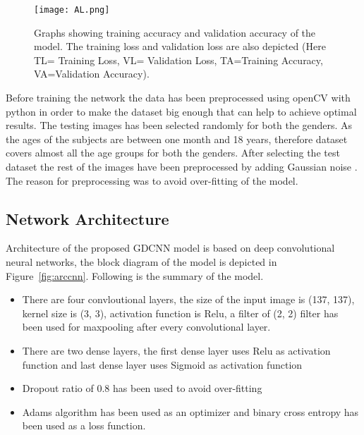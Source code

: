 \documentclass{bioinfo}
\begin{document}
\begin{figure*}[h]%
\texttt{[image: AL.png]}
\caption{Graphs showing training accuracy and validation accuracy of the model. The training loss and validation loss are also depicted (Here TL= Training Loss, VL= Validation Loss, TA=Training Accuracy, VA=Validation Accuracy).}
\label{fig:acculoss}
\end{figure*}
Before training the network the data has been preprocessed using openCV with python in order to make the dataset big enough that can help to achieve optimal results. The testing images has been selected randomly for both the genders. As the ages of the subjects are between one month and 18 years, therefore dataset covers almost all the age groups for both the genders. After selecting the test dataset the rest of the images have been preprocessed by adding Gaussian noise \citep{rmzur09}. The reason for preprocessing was to avoid over-fitting of the model.

\subsection{Network Architecture}

Architecture of the proposed GDCNN model is based on deep convolutional neural networks, the block diagram of the model is depicted in Figure~\ref{fig:arccnn}. Following is the summary of the model.
\begin{itemize}
\item There are four convloutional layers, the size of the input image is (137, 137), kernel size is (3, 3), activation function is Relu, a filter of (2, 2) filter has been used for maxpooling after every convolutional layer.
\item There are two dense layers, the first dense layer  uses Relu as activation function and last dense layer uses Sigmoid as activation function
\item Dropout ratio of 0.8 has been used to avoid over-fitting
\item Adams algorithm has been used as an optimizer and binary cross entropy has been used as a loss function.
\vspace*{1pt}
\end{itemize}
\end{document}
